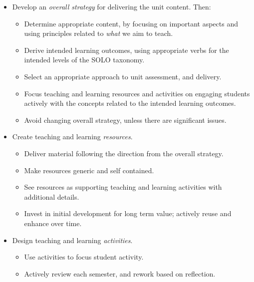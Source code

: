 %
%
%
%


\begin{itemize}[noitemsep,nolistsep]
	\item Develop an \emph{overall strategy} for delivering the unit content. Then:
	\begin{itemize}[noitemsep,nolistsep]
		\item Determine appropriate content, by focusing on important aspects and using principles related to \emph{what} we aim to teach.
		\item Derive intended learning outcomes, using appropriate verbs for the intended levels of the SOLO taxonomy.
		\item Select an appropriate approach to unit assessment, and delivery.
		\item Focus teaching and learning resources and activities on engaging students actively with the concepts related to the intended learning outcomes.
		\item Avoid changing overall strategy, unless there are significant issues.
	\end{itemize}

	\item Create teaching and learning \emph{resources}.
	\begin{itemize}[noitemsep,nolistsep]
		\item Deliver material following the direction from the overall strategy.
		\item Make resources generic and self contained.
		\item See resources as supporting teaching and learning activities with additional details.
		\item Invest in initial development for long term value; actively reuse and enhance over time.
	\end{itemize}

	\item Design teaching and learning \emph{activities}.
	\begin{itemize}[noitemsep,nolistsep]
		\item Use activities to focus student activity.
		\item Actively review each semester, and rework based on reflection.
	\end{itemize}
\end{itemize} 

